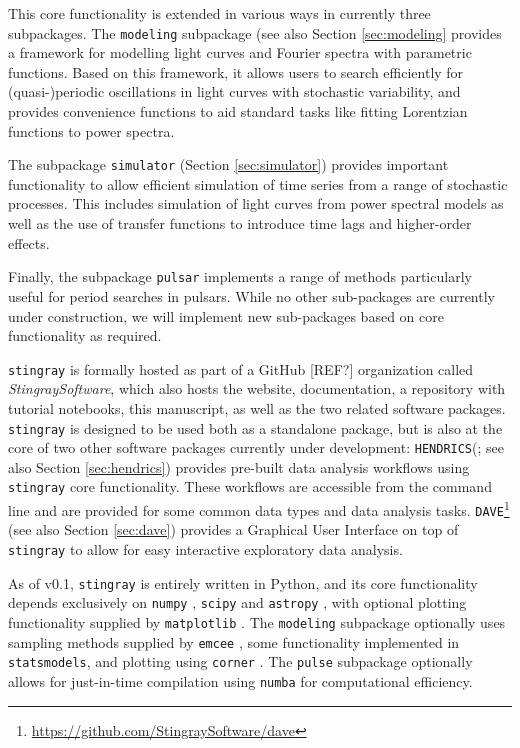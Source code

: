 \documentclass[twocolumn]{aastex62}
\newcommand{\stingray}{\texttt{stingray}\xspace}
\newcommand{\hendrics}{\texttt{HENDRICS}\xspace}
\newcommand{\dave}{\texttt{DAVE}\xspace}
\begin{document}
This core functionality is extended in various ways in currently three subpackages. The \texttt{modeling} subpackage (see also Section \ref{sec:modeling} provides a framework for modelling light curves and Fourier spectra with parametric functions. Based on this framework, it allows users to search efficiently for (quasi-)periodic oscillations in light curves with stochastic variability, and provides convenience functions to aid standard tasks like fitting Lorentzian functions to power spectra. 

The subpackage \texttt{simulator} (Section \ref{sec:simulator}) provides important functionality to allow efficient simulation of time series from a range of stochastic processes. This includes simulation of light curves from power spectral models as well as the use of transfer functions to introduce time lags and higher-order effects. 

Finally, the subpackage \texttt{pulsar} implements a range of methods particularly useful for period searches in pulsars. While no other sub-packages are currently under construction, we will implement new sub-packages based on core functionality as required. 


\stingray is formally hosted as part of a GitHub [REF?] organization called \textit{StingraySoftware}, which also hosts the website, documentation, a repository with tutorial notebooks, this manuscript, as well as the two related software packages. \stingray is designed to be used both as a standalone package, but is also at the core of two other software packages currently under development: \hendrics (\citealt{hendrics}; see also Section \ref{sec:hendrics}) provides pre-built data analysis workflows using \stingray core functionality. These workflows are accessible from the command line and are provided for some common data types and data analysis tasks. \dave\footnote{\url{https://github.com/StingraySoftware/dave}} (see also Section \ref{sec:dave}) provides a Graphical User Interface on top of \stingray to allow for easy interactive exploratory data analysis.
 
As of v0.1, \stingray is entirely written in Python, and its core functionality depends exclusively on \texttt{numpy} \citep{numpy}, \texttt{scipy} \citep{scipy} and \texttt{astropy} \citep{astropy}, with optional plotting functionality supplied by \texttt{matplotlib} \citep{matplotlib} . The \texttt{modeling} subpackage optionally uses sampling methods supplied by \texttt{emcee} \citep{emcee}, some functionality implemented in \texttt{statsmodels}, and plotting using \texttt{corner} \citep{corner}. The \texttt{pulse} subpackage optionally allows for just-in-time compilation using \texttt{numba} \citep{numba} for computational efficiency.
\end{document}
